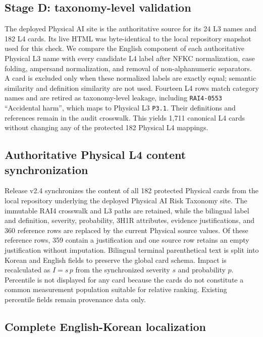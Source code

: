 \documentclass[11pt,a4paper]{article}
\newcommand{\code}[1]{\texttt{#1}}
\begin{document}
\subsection{Stage D: taxonomy-level validation}

The deployed Physical AI site is the authoritative source for its 24 L3 names
and 182 L4 cards. Its live HTML was byte-identical to the local repository
snapshot used for this check. We compare the English component of each
authoritative Physical L3 name with every candidate L4 label after NFKC
normalization, case folding, ampersand normalization, and removal of
non-alphanumeric separators. A card is excluded only when these normalized
labels are exactly equal; semantic similarity and definition similarity are not
used. Fourteen L4 rows match category names and are retired as taxonomy-level
leakage, including \code{RAI4-0553} ``Accidental harm'', which maps to Physical
L3 \code{P3.1}. Their definitions and references remain in the audit crosswalk.
This yields 1,711 canonical L4 cards without changing any of the protected 182
Physical L4 mappings.

\subsection{Authoritative Physical L4 content synchronization}

Release v2.4 synchronizes the content of all 182 protected Physical cards from
the local repository underlying the deployed Physical AI Risk Taxonomy site.
The immutable RAI4 crosswalk and L3 paths are retained, while the bilingual
label and definition, severity, probability, 3H1R attributes, evidence
justifications, and 360 reference rows are replaced by the current Physical
source values. Of these reference rows, 359 contain a justification and one
source row retains an empty justification without imputation. Bilingual
terminal parenthetical text is split into Korean and
English fields to preserve the global card schema. Impact is recalculated as
$I=s\,p$ from the synchronized severity $s$ and probability $p$. Percentile is
not displayed for any card because the cards do not constitute a common
measurement population suitable for relative ranking. Existing percentile
fields remain provenance data only.

\subsection{Complete English-Korean localization}
\end{document}
